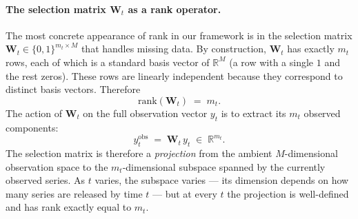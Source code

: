 \documentclass[11pt, a4paper, oneside]{article}
\begin{document}
\paragraph{The selection matrix $\mathbf{W}_t$ as a rank operator.}
The most concrete appearance of rank in our framework is in the
selection matrix $\mathbf{W}_t \in \{0, 1\}^{m_t \times M}$ that
handles missing data. By construction, $\mathbf{W}_t$ has exactly
$m_t$ rows, each of which is a standard basis vector of
$\mathbb{R}^M$ (a row with a single $1$ and the rest zeros). These
rows are linearly independent because they correspond to distinct
basis vectors. Therefore
\[
\mathrm{rank}(\mathbf{W}_t) \;=\; m_t.
\]
The action of $\mathbf{W}_t$ on the full observation vector $y_t$ is
to extract its $m_t$ observed components:
\[
y_t^{\mathrm{obs}} \;=\; \mathbf{W}_t\, y_t \;\in\; \mathbb{R}^{m_t}.
\]
The selection matrix is therefore a \emph{projection} from the
ambient $M$-dimensional observation space to the $m_t$-dimensional
subspace spanned by the currently observed series. As $t$ varies,
the subspace varies — its dimension depends on how many series are
released by time $t$ — but at every $t$ the projection is well-defined
and has rank exactly equal to $m_t$.
\end{document}
